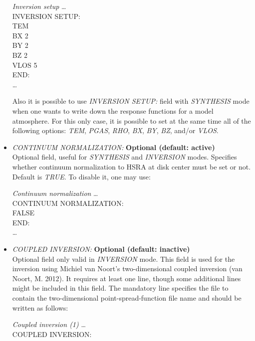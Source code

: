 \begin{itemize}
\begin{ifbox}[label={tb:inversion_setup}]{{\it Inversion setup}}
  \scriptsize
  \ldots\\
  INVERSION SETUP:\\
  TEM\\
  BX   2\\
  BY   2\\
  BZ   2\\
  VLOS  5\\
  END:\\
  \ldots
  \normalsize
\end{ifbox}
  Also it is possible to use {\it INVERSION SETUP:} field with {\it SYNTHESIS} mode when one wants to write down the response functions for a model atmosphere. For this only case, it is possible to set at the same time all of the following options: {\it TEM}, {\it PGAS}, {\it RHO}, {\it BX}, {\it BY}, {\it BZ}, and/or {\it VLOS}.\\
  \item {\it CONTINUUM NORMALIZATION:} {\bf Optional (default: active)}\\
  Optional field, useful for {\it SYNTHESIS} and {\it INVERSION} modes. Specifies whether continuum normalization to HSRA at disk center must be set or not. Default is {\it TRUE}. To disable it, one may use:\\
\begin{ifbox}[label={tb:continuum_normalization}]{{\it Continuum normalization}}
  \scriptsize
  \ldots\\
  CONTINUUM NORMALIZATION:\\
  FALSE\\
  END:\\
  \ldots
  \normalsize
\end{ifbox}
  \item {\it COUPLED INVERSION:} {\bf Optional (default: inactive)}\\
  Optional field only valid in {\it INVERSION} mode. This field is used for the inversion using Michiel van Noort's two-dimensional coupled inversion (van Noort, M. 2012). It requires at least one line, though some additional lines might be included in this field. The mandatory line specifies the file to contain the two-dimensional point-spread-function file name and should be written as follows:\\
\begin{ifbox}[label={tb:coupled_inversion1}]{{\it Coupled inversion (1)}}
  \scriptsize
  \ldots\\
  COUPLED INVERSION:\\

\end{ifbox}
\end{itemize}
